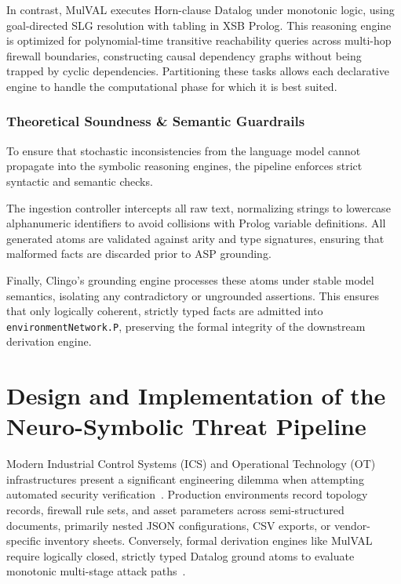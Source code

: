 \documentclass[target=mst,aauheader=aics,style=]{thud}
\begin{document}
In contrast, MulVAL executes Horn-clause Datalog under monotonic logic, using goal-directed SLG resolution with tabling in XSB Prolog. This reasoning engine is optimized for polynomial-time transitive reachability queries across multi-hop firewall boundaries, constructing causal dependency graphs without being trapped by cyclic dependencies. Partitioning these tasks allows each declarative engine to handle the computational phase for which it is best suited.

\subsection{Theoretical Soundness \& Semantic Guardrails}
To ensure that stochastic inconsistencies from the language model cannot propagate into the symbolic reasoning engines, the pipeline enforces strict syntactic and semantic checks. 

The ingestion controller intercepts all raw text, normalizing strings to lowercase alphanumeric identifiers to avoid collisions with Prolog variable definitions. All generated atoms are validated against arity and type signatures, ensuring that malformed facts are discarded prior to ASP grounding. 

Finally, Clingo's grounding engine processes these atoms under stable model semantics, isolating any contradictory or ungrounded assertions. This ensures that only logically coherent, strictly typed facts are admitted into \texttt{environmentNetwork.P}, preserving the formal integrity of the downstream derivation engine.

\chapter{Design and Implementation of the Neuro-Symbolic Threat Pipeline}
\label{chap:implementation}

Modern Industrial Control Systems (ICS) and Operational Technology (OT) infrastructures present a significant engineering dilemma when attempting automated security verification~\cite{SunderOT}. Production environments record topology records, firewall rule sets, and asset parameters across semi-structured documents, primarily nested JSON configurations, CSV exports, or vendor-specific inventory sheets. Conversely, formal derivation engines like MulVAL require logically closed, strictly typed Datalog ground atoms to evaluate monotonic multi-stage attack paths~\cite{Ou05}.
\end{document}
